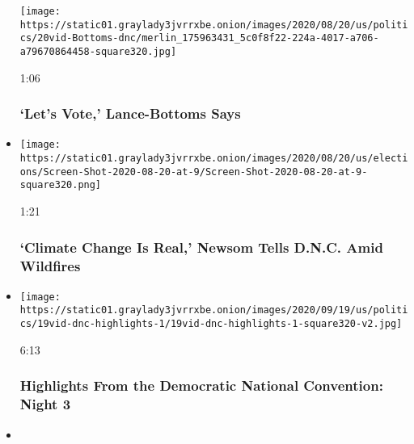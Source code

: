 \begin{itemize}
  \texttt{[image: https://static01.graylady3jvrrxbe.onion/images/2020/08/20/us/politics/20vid-Bottoms-dnc/merlin\_175963431\_5c0f8f22-224a-4017-a706-a79670864458-square320.jpg]}

  1:06

  \hypertarget{lets-vote-lance-bottoms-says}{%
  \subsubsection{`Let's Vote,' Lance-Bottoms
  Says}\label{lets-vote-lance-bottoms-says}}
\item
  \href{https://www.nytimes3xbfgragh.onion/video/us/elections/100000007299993/gavin-newsom-speaks-dnc.html?action=click\&module=video-series-bar\&region=header\&pgtype=Article\&playlistId=video/2020-Elections}{}

  \texttt{[image: https://static01.graylady3jvrrxbe.onion/images/2020/08/20/us/elections/Screen-Shot-2020-08-20-at-9/Screen-Shot-2020-08-20-at-9-square320.png]}

  1:21

  \hypertarget{climate-change-is-real-newsom-tells-dnc-amid-wildfires}{%
  \subsubsection{`Climate Change Is Real,' Newsom Tells D.N.C. Amid
  Wildfires}\label{climate-change-is-real-newsom-tells-dnc-amid-wildfires}}
\item
  \href{https://www.nytimes3xbfgragh.onion/video/us/politics/100000007297733/democratic-national-convention-highlights.html?action=click\&module=video-series-bar\&region=header\&pgtype=Article\&playlistId=video/2020-Elections}{}

  \texttt{[image: https://static01.graylady3jvrrxbe.onion/images/2020/09/19/us/politics/19vid-dnc-highlights-1/19vid-dnc-highlights-1-square320-v2.jpg]}

  6:13

  \hypertarget{highlights-from-the-democratic-national-convention-night-3}{%
  \subsubsection{Highlights From the Democratic National Convention:
  Night
  3}\label{highlights-from-the-democratic-national-convention-night-3}}
\item
  \href{https://www.nytimes3xbfgragh.onion/video/us/elections/100000007297653/barack-obama-full-speech-dnc.html?action=click\&module=video-series-bar\&region=header\&pgtype=Article\&playlistId=video/2020-Elections}{}


\end{itemize}
